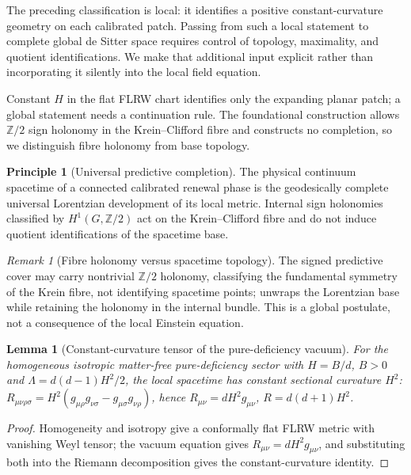 \documentclass[11pt]{article}
\newtheorem{lemma}[theorem]{Lemma}
\theoremstyle{definition}
\newtheorem{principle}[theorem]{Principle}
\theoremstyle{remark}
\newtheorem{remark}[theorem]{Remark}
\newcommand{\Ztwo}{\mathbb Z/2}
\begin{document}
The preceding classification is local: it identifies a positive
constant-curvature geometry on each calibrated patch.  Passing from such a
local statement to complete global de Sitter space requires control of topology,
maximality, and quotient identifications.  We make that additional input
explicit rather than incorporating it silently into the local field equation.

Constant $H$ in the flat FLRW chart identifies only the expanding planar patch; a
global statement needs a continuation rule.  The foundational construction allows
$\Ztwo$ sign holonomy in the Krein--Clifford fibre and constructs no completion, so
we distinguish fibre holonomy from base topology.

\begin{principle}[Universal predictive completion]
\label{prin:universal-predictive-completion}
The physical continuum spacetime of a connected calibrated renewal phase is the
geodesically complete universal Lorentzian development of its local metric.
Internal sign holonomies classified by $H^1(G,\Ztwo)$ act on the Krein--Clifford
fibre and do not induce quotient identifications of the spacetime base.
\end{principle}

\begin{remark}[Fibre holonomy versus spacetime topology]
\label{rem:fibre-versus-base-holonomy}
The signed predictive cover may carry nontrivial $\Ztwo$ holonomy, classifying the
fundamental symmetry of the Krein fibre, not identifying spacetime points;
 unwraps the Lorentzian base while
retaining the holonomy in the internal bundle.  This is a global postulate, not a
consequence of the local Einstein equation.
\end{remark}

\begin{lemma}[Constant-curvature tensor of the pure-deficiency vacuum]
\label{lem:pure-deficiency-constant-curvature}
For the homogeneous isotropic matter-free pure-deficiency sector with $H=B/d$,
$B>0$ and $\Lambda=d(d-1)H^2/2$, the local spacetime has constant sectional
curvature $H^2$:
$R_{\mu\nu\rho\sigma}=H^2(g_{\mu\rho}g_{\nu\sigma}-g_{\mu\sigma}g_{\nu\rho})$,
hence $R_{\mu\nu}=dH^2g_{\mu\nu}$, $R=d(d+1)H^2$.
\end{lemma}

\begin{proof}
Homogeneity and isotropy give a conformally flat FLRW metric with vanishing Weyl
tensor; the vacuum equation gives $R_{\mu\nu}=dH^2g_{\mu\nu}$, and substituting both
into the Riemann decomposition gives the constant-curvature identity.
\end{proof}
\end{document}
